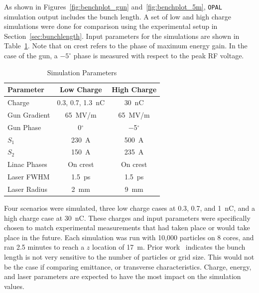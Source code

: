 As shown in Figures~\ref{fig:benchplot_gun} and~\ref{fig:benchplot_5m}, 
\verb|OPAL| simulation output includes the bunch length.
A set of low and high charge simulations were done  
for comparison using the experimental setup in Section~\ref{sec:bunchlength}.
Input parameters for the simulations are shown in Table~\ref{simparam}.
Note that on crest refers to the phase of maximum energy gain.
In the case of the gun, a $-5^{\circ}$ phase is measured 
with respect to the peak RF voltage.
\begin{table}[hbt]
	\centering
	\caption{Simulation Parameters}
	\begin{tabular}{lcc}
		\toprule
		\toprule
		\textbf{Parameter} & \textbf{Low Charge}  & \textbf{High Charge} \\
		\midrule
		Charge       & 0.3, 0.7, \SI{1.3}{nC}        & \SI{30}{nC}    \\ %
		Gun Gradient & \SI{65}{MV/m}     & \SI{65}{MV/m}  \\ %
		Gun Phase    & \SI{0}{}$^{\circ}$ & \SI{-5}{}$^{\circ}$ \\		 
		$S_1$        & \SI{230}{A}		 & \SI{500}{A}	  \\
		$S_2$		 & \SI{150}{A}   	 & \SI{235}{A}		 \\
		Linac Phases & On crest          & On crest       \\
		Laser FWHM   & \SI{1.5}{ps}      & \SI{1.5}{ps}   \\ %
		Laser Radius & \SI{2}{mm}        & \SI{9}{mm}     \\
		\bottomrule
	\end{tabular}
	\label{simparam}
\end{table}

Four scenarios were simulated, three low charge cases at 0.3, 0.7, and \SI{1}{nC}, and a 
high charge case at \SI{30}{nC}. 
These charges and input parameters were specifically chosen to 
match experimental measurements that had taken place or would 
take place in the future. Each simulation was run with 10,000 particles 
on 8 cores, and ran 2.5 minutes to reach a $z$ location of \SI{17}{m}.
Prior work~\cite{benchmark} indicates the bunch length is not 
very sensitive to the number of particles or grid size. 
This would not be the case if comparing emittance, or 
transverse characteristics. Charge, energy, and laser parameters 
are expected to have the most impact on the simulation values.



